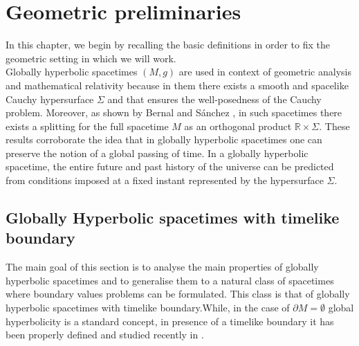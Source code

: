 
\chapter{Geometric preliminaries} %

\label{Chapter1} %


In this chapter, we begin by recalling the basic definitions in order to fix the geometric setting in which we will work.\\
Globally hyperbolic spacetimes $(M,g)$ are used in context of geometric analysis and mathematical relativity because in them there exists a smooth and spacelike Cauchy hypersurface $\Sigma$ and that ensures the well-posedness of the Cauchy problem. Moreover, as shown by Bernal and Sánchez \cite[Th. 1.1]{Bernal-Sanchez-05}, in such spacetimes there exists a splitting for the full spacetime $M$ as an orthogonal product $\mathbb{R}\times\Sigma$. %
These results corroborate the idea that in globally hyperbolic spacetimes one can preserve the notion of a global passing of time. In a globally hyperbolic spacetime, the entire future and past history of the universe can be predicted from conditions imposed at a fixed instant represented by the hypersurface $\Sigma$.\\
%

\section{Globally Hyperbolic spacetimes with timelike boundary}
The main goal of this section is to analyse the main properties of globally hyperbolic spacetimes and to generalise them to a natural class of spacetimes where boundary values problems can be formulated. This class is that of globally hyperbolic spacetimes with timelike boundary.While, in the case of $\partial M=\emptyset$ global hyperbolicity is a standard concept, in presence of a timelike boundary it has been properly defined and studied recently in \cite{Ake-Flores-Sanchez-18}.\\

